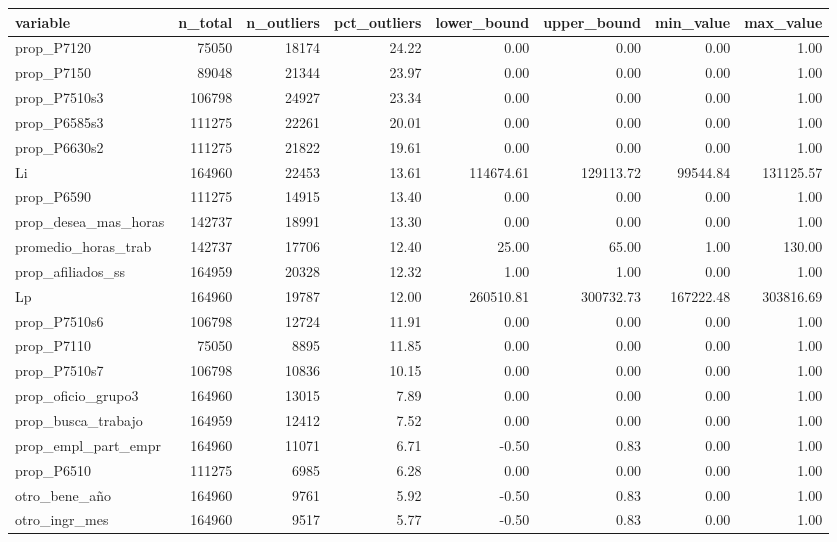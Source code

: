 \begin{table}[ht]
\centering
\begin{tabular}{lrrrrrrr}
  \toprule
variable & n\_total & n\_outliers & pct\_outliers & lower\_bound & upper\_bound & min\_value & max\_value \\ 
  \midrule
prop\_P7120 & 75050 & 18174 & 24.22 & 0.00 & 0.00 & 0.00 & 1.00 \\ 
  prop\_P7150 & 89048 & 21344 & 23.97 & 0.00 & 0.00 & 0.00 & 1.00 \\ 
  prop\_P7510s3 & 106798 & 24927 & 23.34 & 0.00 & 0.00 & 0.00 & 1.00 \\ 
  prop\_P6585s3 & 111275 & 22261 & 20.01 & 0.00 & 0.00 & 0.00 & 1.00 \\ 
  prop\_P6630s2 & 111275 & 21822 & 19.61 & 0.00 & 0.00 & 0.00 & 1.00 \\ 
  Li & 164960 & 22453 & 13.61 & 114674.61 & 129113.72 & 99544.84 & 131125.57 \\ 
  prop\_P6590 & 111275 & 14915 & 13.40 & 0.00 & 0.00 & 0.00 & 1.00 \\ 
  prop\_desea\_mas\_horas & 142737 & 18991 & 13.30 & 0.00 & 0.00 & 0.00 & 1.00 \\ 
  promedio\_horas\_trab & 142737 & 17706 & 12.40 & 25.00 & 65.00 & 1.00 & 130.00 \\ 
  prop\_afiliados\_ss & 164959 & 20328 & 12.32 & 1.00 & 1.00 & 0.00 & 1.00 \\ 
  Lp & 164960 & 19787 & 12.00 & 260510.81 & 300732.73 & 167222.48 & 303816.69 \\ 
  prop\_P7510s6 & 106798 & 12724 & 11.91 & 0.00 & 0.00 & 0.00 & 1.00 \\ 
  prop\_P7110 & 75050 & 8895 & 11.85 & 0.00 & 0.00 & 0.00 & 1.00 \\ 
  prop\_P7510s7 & 106798 & 10836 & 10.15 & 0.00 & 0.00 & 0.00 & 1.00 \\ 
  prop\_oficio\_grupo3 & 164960 & 13015 & 7.89 & 0.00 & 0.00 & 0.00 & 1.00 \\ 
  prop\_busca\_trabajo & 164959 & 12412 & 7.52 & 0.00 & 0.00 & 0.00 & 1.00 \\ 
  prop\_empl\_part\_empr & 164960 & 11071 & 6.71 & -0.50 & 0.83 & 0.00 & 1.00 \\ 
  prop\_P6510 & 111275 & 6985 & 6.28 & 0.00 & 0.00 & 0.00 & 1.00 \\ 
  otro\_bene\_año & 164960 & 9761 & 5.92 & -0.50 & 0.83 & 0.00 & 1.00 \\ 
  otro\_ingr\_mes & 164960 & 9517 & 5.77 & -0.50 & 0.83 & 0.00 & 1.00 \\ 

\end{tabular}
\end{table}
